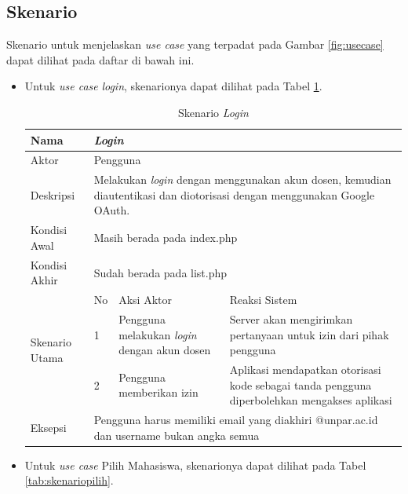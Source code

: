 \subsection{Skenario}

Skenario untuk menjelaskan {\it use case} yang terpadat pada Gambar \ref{fig:usecase}
dapat dilihat pada daftar di bawah ini.
\begin{itemize}
\item Untuk {\it use case} {\it login}, skenarionya dapat dilihat pada Tabel \ref{tab:skenariologin}.

\begin{table}[ht]
\centering
\caption[Tabel Skenario {\it Login}]{Skenario {\it Login}}
\label{tab:skenariologin}
\begin{tabular}{|p{1.4cm}|p{0.4cm}|p{2cm}|p{2cm}|p{2cm}|p{2cm}|}
\hline
Nama & \multicolumn{5}{p{8cm}|}{{\it Login}} \\ \hline
Aktor & \multicolumn{5}{p{8cm}|}{Pengguna} \\ \hline
Deskripsi & \multicolumn{5}{p{8cm}|}{Melakukan {\it login} dengan menggunakan akun dosen, kemudian diautentikasi dan diotorisasi dengan menggunakan Google OAuth.} \\ \hline
Kondisi Awal & \multicolumn{5}{p{8cm}|}{Masih berada pada index.php} \\ \hline
Kondisi Akhir & \multicolumn{5}{p{8cm}|}{Sudah berada pada list.php}
\\ \hline
\multirow{3}{*}{\parbox{1.4cm}{Skenario Utama}} & No &
\multicolumn{2}{p{4cm}|}{Aksi Aktor} & \multicolumn{2}{p{4cm}|}{Reaksi Sistem}
\\ \cline{2-6}
& 1 & \multicolumn{2}{p{4cm}|}{Pengguna melakukan {\it login} dengan akun dosen} &
\multicolumn{2}{p{4cm}|}{Server akan mengirimkan pertanyaan untuk izin dari pihak pengguna} \\
\cline{2-6} & 2 & \multicolumn{2}{p{4cm}|}{Pengguna memberikan izin} &
\multicolumn{2}{p{4cm}|}{Aplikasi mendapatkan otorisasi kode sebagai tanda pengguna diperbolehkan mengakses aplikasi} \\ \hline
Eksepsi & \multicolumn{5}{p{8cm}|}{Pengguna harus memiliki email yang diakhiri @unpar.ac.id dan username bukan angka semua} \\ \hline
\end{tabular}
\end{table}

\item Untuk {\it use case} Pilih Mahasiswa, skenarionya dapat dilihat pada Tabel \ref{tab:skenariopilih}.


\end{itemize}
